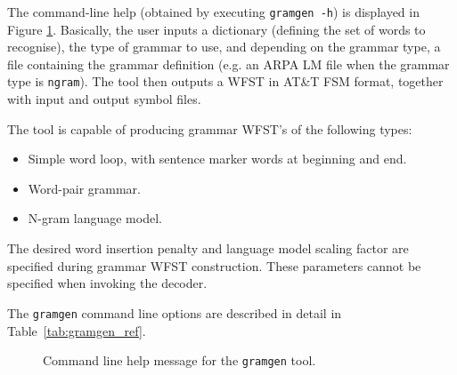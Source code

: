 \documentclass[a4paper,12pt]{report}
\begin{document}
The command-line help (obtained by executing {\tt gramgen -h}) is displayed in Figure \ref{fig:gramgen_help}. Basically, the user inputs a dictionary (defining the set of words to recognise), the type of grammar to use, and depending on the grammar type, a file containing the grammar definition (e.g. an ARPA LM file when the grammar type is {\tt ngram}). The tool then outputs a WFST in AT\&T FSM format, together with input and output symbol files.

The tool is capable of producing grammar WFST's of the following types:
\begin{itemize}
\item Simple word loop, with sentence marker words at beginning and end.
\item Word-pair grammar.
\item N-gram language model.
\end{itemize}

The desired word insertion penalty and language model scaling factor are specified during grammar WFST construction. These parameters cannot be specified when invoking the decoder.

The {\tt gramgen} command line options are described in detail in Table~\ref{tab:gramgen_ref}.

\begin{figure}
\begin{center}
\caption{Command line help message for the {\tt gramgen} tool.}
\label{fig:gramgen_help}
\end{center}
\end{figure}
\end{document}
